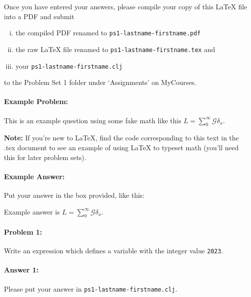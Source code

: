 \documentclass[10pt]{article}
\newenvironment{AnswerBox}{\begin{mdframed}[style=simple]}{\end{mdframed}}
\newcommand{\required}[1]{{\color{blue}{#1}}}
\newcommand{\PSnum}{1}
\begin{document}
Once you have entered your answers, please compile your copy of this \LaTeX{}
file into a PDF and submit
\begin{enumerate}[(i),noitemsep]
  \item the compiled PDF renamed to \texttt{ps\PSnum-lastname-firstname.pdf}
  \item the raw \LaTeX{} file renamed to
    \texttt{ps\PSnum-lastname-firstname.tex} and
  \item your \texttt{ps\PSnum-lastname-firstname.clj}
\end{enumerate}
to the Problem Set \PSnum{} folder under `Assignments' on MyCourses.




\noindent\hrulefill%

\paragraph{Example Problem:} This is an example question using some fake math
like this $L=\sum_0^{\infty} \mathcal{G} \delta_x$.

\textbf{Note:} If you're new to \LaTeX{}, find the code corresponding to this
text in the .tex document to see an example of using \LaTeX{} to typeset math
(you'll need this for later problem sets).


\paragraph{Example Answer:} Put your answer in the box provided, like this:
\begin{AnswerBox}
  Example answer is $L=\sum_0^{\infty} \mathcal{G} \delta_x$.
\end{AnswerBox}


\clearpage\pagebreak

\noindent\hrulefill%


\paragraph{Problem 1:}
Write an expression which defines a variable \required{\texttt{year}} with the
integer value \texttt{2023}.

\paragraph{Answer 1:} Please put your answer in
\texttt{ps\PSnum-lastname-firstname.clj}.
\end{document}
